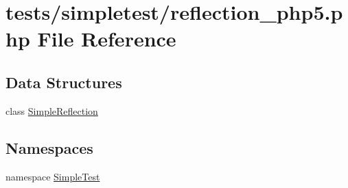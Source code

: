 \hypertarget{reflection__php5_8php}{\section{tests/simpletest/reflection\-\_\-php5.php File Reference}
\label{reflection__php5_8php}
}
\subsection*{Data Structures}
\begin{DoxyCompactItemize}
\item 
class \hyperlink{class_simple_reflection}{Simple\-Reflection}
\end{DoxyCompactItemize}
\subsection*{Namespaces}
\begin{DoxyCompactItemize}
\item 
namespace \hyperlink{namespace_simple_test}{Simple\-Test}
\end{DoxyCompactItemize}
